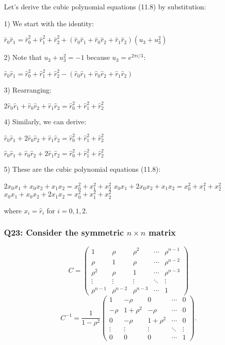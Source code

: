 \documentclass[8pt]{article}
\begin{document}
Let's derive the cubic polynomial equations (11.8) by substitution:

1) We start with the identity:

   $\hat{r}_0 \hat{r}_1 = \hat{r}_0^2 + \hat{r}_1^2 + \hat{r}_2^2 + (\hat{r}_0 \hat{r}_1 + \hat{r}_0 \hat{r}_2 + \hat{r}_1 \hat{r}_2)(u_3 + u_3^2)$

2) Note that $u_3 + u_3^2 = -1$ because $u_3 = e^{2\pi i/3}$:

   $\hat{r}_0 \hat{r}_1 = \hat{r}_0^2 + \hat{r}_1^2 + \hat{r}_2^2 - (\hat{r}_0 \hat{r}_1 + \hat{r}_0 \hat{r}_2 + \hat{r}_1 \hat{r}_2)$

3) Rearranging:

   $2\hat{r}_0 \hat{r}_1 + \hat{r}_0 \hat{r}_2 + \hat{r}_1 \hat{r}_2 = \hat{r}_0^2 + \hat{r}_1^2 + \hat{r}_2^2$

4) Similarly, we can derive:

   $\hat{r}_0 \hat{r}_1 + 2\hat{r}_0 \hat{r}_2 + \hat{r}_1 \hat{r}_2 = \hat{r}_0^2 + \hat{r}_1^2 + \hat{r}_2^2$
   
   $\hat{r}_0 \hat{r}_1 + \hat{r}_0 \hat{r}_2 + 2\hat{r}_1 \hat{r}_2 = \hat{r}_0^2 + \hat{r}_1^2 + \hat{r}_2^2$

5) These are the cubic polynomial equations (11.8):

   $2x_0x_1 + x_0x_2 + x_1x_2 = x_0^2 + x_1^2 + x_2^2$
   $x_0x_1 + 2x_0x_2 + x_1x_2 = x_0^2 + x_1^2 + x_2^2$
   $x_0x_1 + x_0x_2 + 2x_1x_2 = x_0^2 + x_1^2 + x_2^2$

where $x_i = \hat{r}_i$ for $i = 0, 1, 2$.

\subsubsection*{Q23: Consider the symmetric \(n \times n\) matrix}
\[
C = \begin{pmatrix}
1 & \rho & \rho^2 & \cdots & \rho^{n-1} \\
\rho & 1 & \rho & \cdots & \rho^{n-2} \\
\rho^2 & \rho & 1 & \cdots & \rho^{n-3} \\
\vdots & \vdots & \vdots & \ddots & \vdots \\
\rho^{n-1} & \rho^{n-2} & \rho^{n-3} & \cdots & 1
\end{pmatrix}
\]
\[
C^{-1} = \frac{1}{1 - \rho^2} \begin{pmatrix}
1 & -\rho & 0 & \cdots & 0 \\
-\rho & 1 + \rho^2 & -\rho & \cdots & 0 \\
0 & -\rho & 1 + \rho^2 & \cdots & 0 \\
\vdots & \vdots & \vdots & \ddots & \vdots \\
0 & 0 & 0 & \cdots & 1
\end{pmatrix}.
\]
\end{document}
